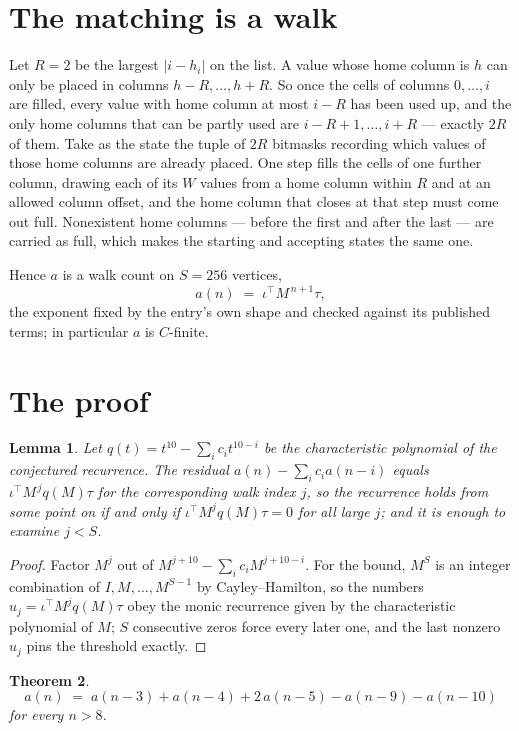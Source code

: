 \documentclass[11pt,a4paper]{article}
\theoremstyle{plain}
\newtheorem{theorem}{Theorem}
\newtheorem{lemma}[theorem]{Lemma}
\theoremstyle{definition}
\begin{document}
\section{The matching is a walk}

Let $R=2$ be the largest $|i-h_i|$ on the list. A value whose home column is $h$ can only be
placed in columns $h-R,\dots,h+R$. So once the cells of columns $0,\dots,i$ are filled, every
value with home column at most $i-R$ has been used up, and the only home columns that can be
partly used are $i-R+1,\dots,i+R$ --- exactly $2R$ of them. Take as the state the tuple of
$2R$ bitmasks recording which values of those home columns are already placed. One step fills
the cells of one further column, drawing each of its $W$ values from a home column within $R$
and at an allowed column offset, and the home column that closes at that step must come out
full. Nonexistent home columns --- before the first and after the last --- are carried as
full, which makes the starting and accepting states the same one.

Hence $a$ is a walk count on $S=256$ vertices,
\[
a(n)\;=\;\iota^{\!\top}M^{\,n+1}\tau ,
\]
the exponent fixed by the entry's own shape and checked against its published terms; in
particular $a$ is $C$-finite.

\section{The proof}

\begin{lemma}\label{lem:crit}
Let $q(t)=t^{10}-\sum_i c_it^{10-i}$ be the characteristic polynomial of the
conjectured recurrence. The residual $a(n)-\sum_ic_ia(n-i)$ equals
$\iota^{\!\top}M^{\,j}q(M)\tau$ for the corresponding walk index $j$, so the recurrence
holds from some point on if and only if $\iota^{\!\top}M^{j}q(M)\tau=0$ for all large $j$;
and it is enough to examine $j<S$.
\end{lemma}

\begin{proof}
Factor $M^{j}$ out of $M^{j+10}-\sum_ic_iM^{j+10-i}$. For the bound, $M^{S}$
is an integer combination of $I,M,\dots,M^{S-1}$ by Cayley--Hamilton, so the numbers
$u_j=\iota^{\!\top}M^{j}q(M)\tau$ obey the monic recurrence given by the characteristic
polynomial of $M$; $S$ consecutive zeros force every later one, and the last nonzero $u_j$
pins the threshold exactly.
\end{proof}

\begin{theorem}
\[
a(n)\;=\;a(n-3) + a(n-4) + 2\,a(n-5) - a(n-9) - a(n-10)
\]
for every $n>8$.
\end{theorem}
\end{document}
